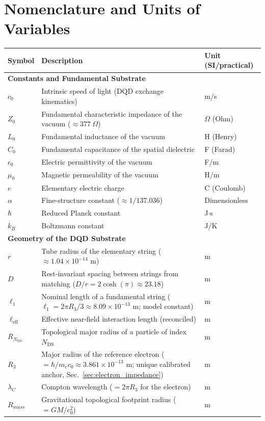 \documentclass[11pt,a4paper]{article}
\theoremstyle{plain}
\theoremstyle{remark}
\newcommand{\Ncd}{\ensuremath{N_{\mathrm{DS}}}}
\begin{document}
\section{Nomenclature and Units of Variables}
\begin{longtable}{l >{\raggedright\arraybackslash}p{8.8cm} l}
\toprule
\textbf{Symbol} & \textbf{Description} & \textbf{Unit (SI/practical)} \\
\midrule
\endhead

\multicolumn{3}{l}{\textbf{Constants and Fundamental Substrate}} \\
$c_0$ & Intrinsic speed of light (DQD exchange kinematics) & m/s \\
$Z_0$ & Fundamental characteristic impedance of the vacuum ($\approx 377~\Omega$) & $\Omega$ (Ohm) \\
$L_0$ & Fundamental inductance of the vacuum & H (Henry) \\
$C_0$ & Fundamental capacitance of the spatial dielectric & F (Farad) \\
$\epsilon_0$ & Electric permittivity of the vacuum & F/m \\
$\mu_0$ & Magnetic permeability of the vacuum & H/m \\
$e$ & Elementary electric charge & C (Coulomb) \\
$\alpha$ & Fine-structure constant ($\approx 1/137.036$) & Dimensionless \\
$\hbar$ & Reduced Planck constant & J$\cdot$s \\
$k_B$ & Boltzmann constant & J/K \\
\midrule

\multicolumn{3}{l}{\textbf{Geometry of the DQD Substrate}} \\
$r$ & Tube radius of the elementary string ($\approx 1.04 \times 10^{-14}$ m) & m \\
$D$ & Rest-invariant spacing between strings from matching ($D/r = 2\cosh(\pi) \approx 23.18$) & m \\
$\ell_1$ & Nominal length of a fundamental string ($\ell_1 = 2\pi R_3/3 \approx 8.09 \times 10^{-13}$ m; model constant) & m \\
$\ell_{\text{eff}}$ & Effective near-field interaction length (reconciled) & m \\
$R_{\Ncd}$ & Topological major radius of a particle of index $\Ncd$ & m \\
$R_3$ & Major radius of the reference electron ($= \hbar/m_e c_0 \approx 3.861 \times 10^{-13}$ m; unique calibrated anchor, Sec.~\ref{sec:electron_impedance}) & m \\
$\lambda_C$ & Compton wavelength ($= 2\pi R_3$ for the electron) & m \\
$R_{mass}$ & Gravitational topological footprint radius ($= GM/c_0^2$) & m \\
\midrule


\end{longtable}
\end{document}
